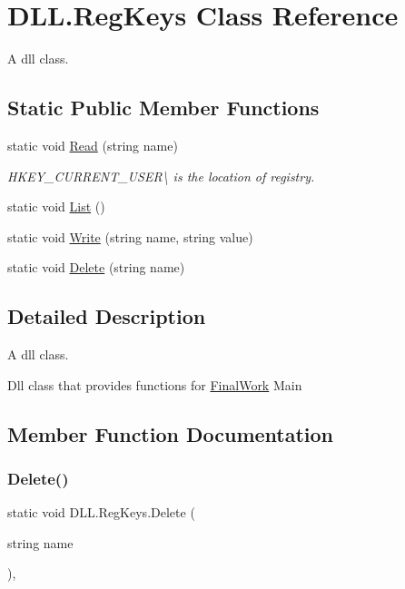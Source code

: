 \hypertarget{class_d_l_l_1_1_reg_keys}{}\section{D\+L\+L.\+Reg\+Keys Class Reference}
\label{class_d_l_l_1_1_reg_keys}


A dll class.  


\subsection*{Static Public Member Functions}
\begin{DoxyCompactItemize}
\item 
static void \hyperlink{class_d_l_l_1_1_reg_keys_aed3a3b9a221dc23713e74117384b7edf}{Read} (string name)
\begin{DoxyCompactList}\small\item\em H\+K\+E\+Y\+\_\+\+C\+U\+R\+R\+E\+N\+T\+\_\+\+U\+S\+ER\textbackslash{} is the location of registry. \end{DoxyCompactList}\item 
static void \hyperlink{class_d_l_l_1_1_reg_keys_a35d1d2983964074d9d2921927929b6f8}{List} ()
\item 
static void \hyperlink{class_d_l_l_1_1_reg_keys_ad62d8ed665347517b672f4b44be25428}{Write} (string name, string value)
\item 
static void \hyperlink{class_d_l_l_1_1_reg_keys_ab7660bde1ef9513277c12d0aca444c8d}{Delete} (string name)
\end{DoxyCompactItemize}


\subsection{Detailed Description}
A dll class. 

Dll class that provides functions for \hyperlink{namespace_final_work}{Final\+Work} Main 

\subsection{Member Function Documentation}
\hypertarget{class_d_l_l_1_1_reg_keys_ab7660bde1ef9513277c12d0aca444c8d}{}\label{class_d_l_l_1_1_reg_keys_ab7660bde1ef9513277c12d0aca444c8d} 
\subsubsection{\texorpdfstring{Delete()}{Delete()}}
{\footnotesize\ttfamily static void D\+L\+L.\+Reg\+Keys.\+Delete (\begin{DoxyParamCaption}\item[{string}]{name }\end{DoxyParamCaption})\hspace{0.3cm}{\ttfamily [inline]}, {\ttfamily [static]}}

